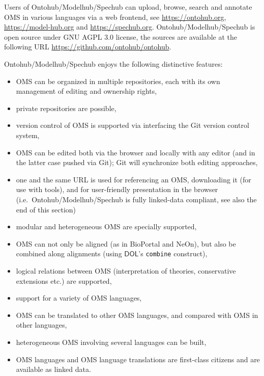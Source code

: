 \documentclass[10pt,fleqn,final]{scrreprt}
\newcommand{\cbs}[0]{\color{red}\xspace} %
\newcommand{\cbe}[0]{\color{black}\xspace} %
\newcommand*{\syntax}[1]{\texttt{#1}}
\newcommand*{\DOL}{\ensuremath{\mathsf{DOL}}\xspace}
\begin{document}
Users of Ontohub/Modelhub/Spechub can upload, browse, search and annotate 
OMS in various languages via a web frontend, 
see \url{https://ontohub.org}, \url{https://model-hub.org} and \url{https://spechub.org}.
Ontohub/Modelhub/Spechub is open source under GNU AGPL 3.0 license,  the sources are available at the following URL 
\url{https://github.com/ontohub/ontohub}.

Ontohub/Modelhub/Spechub enjoys the following distinctive features:
\begin{itemize}
  \item OMS can be organized in multiple repositories, each
     with its own management of editing and ownership rights,
  \item private repositories are possible,
  \item version control of OMS is supported via interfacing
   the Git version control system,
  \item OMS can be edited both via the browser and locally with any
  editor (and in the latter case pushed via Git); Git will synchronize both editing approaches,
  \item one and the same URL is used for referencing an OMS, downloading
     it (for use with tools), and for user-friendly presentation in
     the browser (i.e.\ Ontohub/Modelhub/Spechub is fully linked-data compliant, \cbs see also the end of this section\cbe)
  \item modular and heterogeneous OMS are specially supported,
  \item OMS can not only be aligned (as in BioPortal and NeOn), but also be combined along alignments (using \DOL's \syntax{combine} construct),
  \item logical relations between OMS (interpretation of theories, conservative
  extensions etc.) are supported,
  \item support for a variety of OMS languages, 
  \item OMS can be translated to other OMS languages, and compared with
   OMS in other languages,
  \item heterogeneous OMS involving several languages can be built,
  \item OMS languages and OMS language translations are first-class
   citizens and are available as linked data.
\end{itemize}
\end{document}
